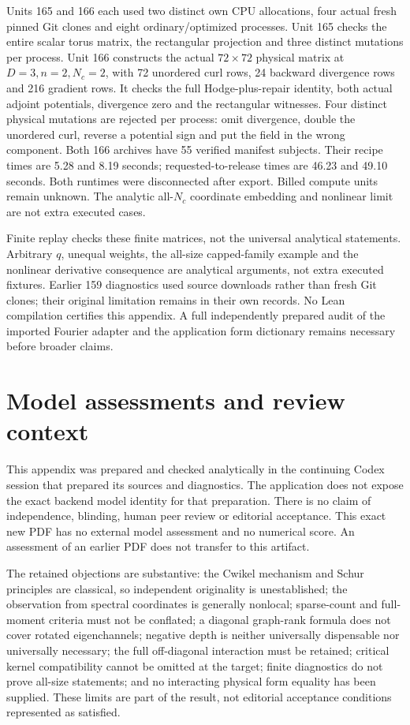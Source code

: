 \documentclass[11pt,a4paper]{article}
\begin{document}
Units 165 and 166 each used two distinct own CPU allocations, four actual
fresh pinned Git clones and eight ordinary/optimized processes. Unit 165
checks the entire scalar torus matrix, the rectangular projection and three
distinct mutations per process. Unit 166 constructs the actual $72\times72$
physical matrix at $D=3,n=2,N_c=2$, with 72 unordered curl rows, 24 backward
divergence rows and 216 gradient rows. It checks the full Hodge-plus-repair
identity, both actual adjoint potentials, divergence zero and the rectangular
witnesses. Four distinct physical mutations are rejected per process: omit
divergence, double the unordered curl, reverse a potential sign and put the
field in the wrong component. Both 166 archives have 55 verified manifest
subjects. Their recipe times are 5.28 and 8.19 seconds; requested-to-release
times are 46.23 and 49.10 seconds. Both runtimes were disconnected after
export. Billed compute units remain unknown. The analytic all-$N_c$ coordinate
embedding and nonlinear limit are not extra executed cases.

Finite replay checks these finite matrices, not the universal analytical
statements. Arbitrary $q$, unequal weights, the all-size capped-family example
and the nonlinear derivative consequence are analytical arguments, not extra
executed fixtures. Earlier 159 diagnostics used source downloads rather than
fresh Git clones; their original limitation remains in their own records.
No Lean compilation certifies this appendix. A full independently prepared
audit of the imported Fourier adapter and the application form dictionary
remains necessary before broader claims.

\section{Model assessments and review context}
This appendix was prepared and checked analytically in the continuing Codex
session that prepared its sources and diagnostics. The application does not
expose the exact backend model identity for that preparation. There is no
claim of independence, blinding, human peer review or editorial acceptance.
This exact new PDF has no external model assessment and no numerical score.
An assessment of an earlier PDF does not transfer to this artifact.

The retained objections are substantive: the Cwikel mechanism and Schur
principles are classical, so independent originality is unestablished; the
observation from spectral coordinates is generally nonlocal; sparse-count
and full-moment criteria must not be conflated; a diagonal graph-rank formula
does not cover rotated eigenchannels; negative depth is neither universally
dispensable nor universally necessary; the full off-diagonal interaction must
be retained; critical kernel compatibility cannot be omitted at the target; finite diagnostics do not prove all-size statements; and no
interacting physical form equality has been supplied. These limits are part
of the result, not editorial acceptance conditions represented as satisfied.
\end{document}
